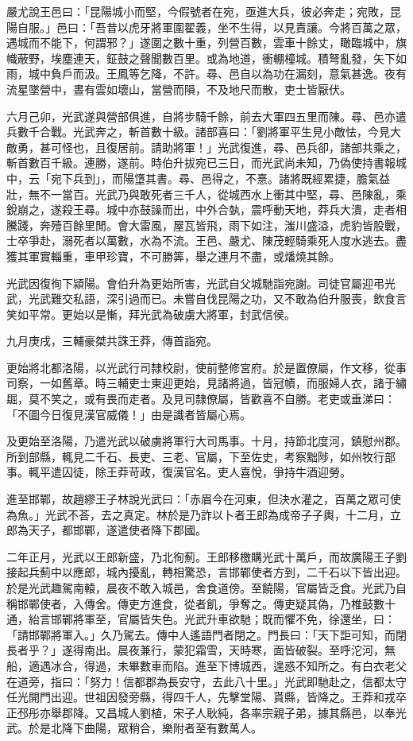 \begin{pinyinscope}
嚴尤說王邑曰：「昆陽城小而堅，今假號者在宛，亟進大兵，彼必奔走；宛敗，昆陽自服。」邑曰：「吾昔以虎牙將軍圍翟義，坐不生得，以見責讓。今將百萬之眾，遇城而不能下，何謂邪？」遂圍之數十重，列營百數，雲車十餘丈，瞰臨城中，旗幟蔽野，埃塵連天，鉦鼓之聲聞數百里。或為地道，衝輣橦城。積弩亂發，矢下如雨，城中負戶而汲。王鳳等乞降，不許。尋、邑自以為功在漏刻，意氣甚逸。夜有流星墜營中，晝有雲如壞山，當營而隕，不及地尺而散，吏士皆厭伏。

六月己卯，光武遂與營部俱進，自將步騎千餘，前去大軍四五里而陳。尋、邑亦遣兵數千合戰。光武奔之，斬首數十級。諸部喜曰：「劉將軍平生見小敵怯，今見大敵勇，甚可怪也，且復居前。請助將軍！」光武復進，尋、邑兵卻，諸部共乘之，斬首數百千級。連勝，遂前。時伯升拔宛已三日，而光武尚未知，乃偽使持書報城中，云「宛下兵到」，而陽墯其書。尋、邑得之，不憙。諸將既經累捷，膽氣益壯，無不一當百。光武乃與敢死者三千人，從城西水上衝其中堅，尋、邑陳亂，乘銳崩之，遂殺王尋。城中亦鼓譟而出，中外合埶，震呼動天地，莽兵大潰，走者相騰踐，奔殪百餘里閒。會大雷風，屋瓦皆飛，雨下如注，滍川盛溢，虎豹皆股戰，士卒爭赴，溺死者以萬數，水為不流。王邑、嚴尤、陳茂輕騎乘死人度水逃去。盡獲其軍實輜重，車甲珍寶，不可勝筭，舉之連月不盡，或燔燒其餘。

光武因復徇下潁陽。會伯升為更始所害，光武自父城馳詣宛謝。司徒官屬迎弔光武，光武難交私語，深引過而已。未嘗自伐昆陽之功，又不敢為伯升服喪，飲食言笑如平常。更始以是慚，拜光武為破虜大將軍，封武信侯。

九月庚戌，三輔豪桀共誅王莽，傳首詣宛。

更始將北都洛陽，以光武行司隸校尉，使前整修宮府。於是置僚屬，作文移，從事司察，一如舊章。時三輔吏士東迎更始，見諸將過，皆冠幘，而服婦人衣，諸于繡镼，莫不笑之，或有畏而走者。及見司隸僚屬，皆歡喜不自勝。老吏或垂涕曰：「不圖今日復見漢官威儀！」由是識者皆屬心焉。

及更始至洛陽，乃遣光武以破虜將軍行大司馬事。十月，持節北度河，鎮慰州郡。所到部縣，輒見二千石、長吏、三老、官屬，下至佐史，考察黜陟，如州牧行部事。輒平遣囚徒，除王莽苛政，復漢官名。吏人喜悅，爭持牛酒迎勞。

進至邯鄲，故趙繆王子林說光武曰：「赤眉今在河東，但決水灌之，百萬之眾可使為魚。」光武不荅，去之真定。林於是乃詐以卜者王郎為成帝子子輿，十二月，立郎為天子，都邯鄲，遂遣使者降下郡國。

二年正月，光武以王郎新盛，乃北徇薊。王郎移檄購光武十萬戶，而故廣陽王子劉接起兵薊中以應郎，城內擾亂，轉相驚恐，言邯鄲使者方到，二千石以下皆出迎。於是光武趣駕南轅，晨夜不敢入城邑，舍食道傍。至饒陽，官屬皆乏食。光武乃自稱邯鄲使者，入傳舍。傳吏方進食，從者飢，爭奪之。傳吏疑其偽，乃椎鼓數十通，紿言邯鄲將軍至，官屬皆失色。光武升車欲馳；既而懼不免，徐還坐，曰：「請邯鄲將軍入。」久乃駕去。傳中人遙語門者閉之。門長曰：「天下詎可知，而閉長者乎？」遂得南出。晨夜兼行，蒙犯霜雪，天時寒，面皆破裂。至呼沱河，無船，適遇冰合，得過，未畢數車而陷。進至下博城西，遑惑不知所之。有白衣老父在道旁，指曰：「努力！信都郡為長安守，去此八十里。」光武即馳赴之，信都太守任光開門出迎。世祖因發旁縣，得四千人，先擊堂陽、貰縣，皆降之。王莽和戎卒正邳彤亦舉郡降。又昌城人劉植，宋子人耿純，各率宗親子弟，據其縣邑，以奉光武。於是北降下曲陽，眾稍合，樂附者至有數萬人。


\end{pinyinscope}
